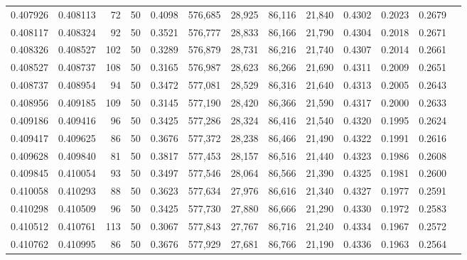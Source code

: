 \begin{tabular}{rrrrrrrrrrrrr}
0.407926 & 0.408113 &    72 &  50 &                                     0.4098 & 576,685 &  28,925 &  86,116 &  21,840 & 0.4302 & 0.2023 & 0.2679 \\
0.408117 & 0.408324 &    92 &  50 &                                     0.3521 & 576,777 &  28,833 &  86,166 &  21,790 & 0.4304 & 0.2018 & 0.2671 \\
0.408326 & 0.408527 &   102 &  50 &                                     0.3289 & 576,879 &  28,731 &  86,216 &  21,740 & 0.4307 & 0.2014 & 0.2661 \\
0.408527 & 0.408737 &   108 &  50 &                                     0.3165 & 576,987 &  28,623 &  86,266 &  21,690 & 0.4311 & 0.2009 & 0.2651 \\
0.408737 & 0.408954 &    94 &  50 &                                     0.3472 & 577,081 &  28,529 &  86,316 &  21,640 & 0.4313 & 0.2005 & 0.2643 \\
0.408956 & 0.409185 &   109 &  50 &                                     0.3145 & 577,190 &  28,420 &  86,366 &  21,590 & 0.4317 & 0.2000 & 0.2633 \\
0.409186 & 0.409416 &    96 &  50 &                                     0.3425 & 577,286 &  28,324 &  86,416 &  21,540 & 0.4320 & 0.1995 & 0.2624 \\
0.409417 & 0.409625 &    86 &  50 &                                     0.3676 & 577,372 &  28,238 &  86,466 &  21,490 & 0.4322 & 0.1991 & 0.2616 \\
0.409628 & 0.409840 &    81 &  50 &                                     0.3817 & 577,453 &  28,157 &  86,516 &  21,440 & 0.4323 & 0.1986 & 0.2608 \\
0.409845 & 0.410054 &    93 &  50 &                                     0.3497 & 577,546 &  28,064 &  86,566 &  21,390 & 0.4325 & 0.1981 & 0.2600 \\
0.410058 & 0.410293 &    88 &  50 &                                     0.3623 & 577,634 &  27,976 &  86,616 &  21,340 & 0.4327 & 0.1977 & 0.2591 \\
0.410298 & 0.410509 &    96 &  50 &                                     0.3425 & 577,730 &  27,880 &  86,666 &  21,290 & 0.4330 & 0.1972 & 0.2583 \\
0.410512 & 0.410761 &   113 &  50 &                                     0.3067 & 577,843 &  27,767 &  86,716 &  21,240 & 0.4334 & 0.1967 & 0.2572 \\
0.410762 & 0.410995 &    86 &  50 &                                     0.3676 & 577,929 &  27,681 &  86,766 &  21,190 & 0.4336 & 0.1963 & 0.2564 \\

\end{tabular}

